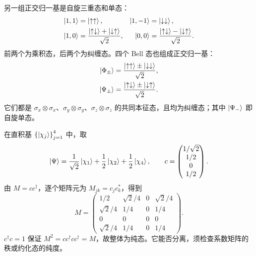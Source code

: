 另一组正交归一基是自旋三重态和单态：
\begin{align}
\Ket{1,1}&=\Ket{\uparrow\uparrow},&\Ket{1,-1}&=\Ket{\downarrow\downarrow},\\
\Ket{1,0}&=\frac{\Ket{\uparrow\downarrow}+\Ket{\downarrow\uparrow}}{\sqrt2},&
\Ket{0,0}&=\frac{\Ket{\uparrow\downarrow}-\Ket{\downarrow\uparrow}}{\sqrt2}.
\end{align}
前两个为乘积态，后两个为纠缠态。四个 Bell 态也组成正交归一基：
\begin{align}
\Ket{\Phi_\pm}&=\frac{\Ket{\uparrow\uparrow}\pm\Ket{\downarrow\downarrow}}{\sqrt2},\\
\Ket{\Psi_\pm}&=\frac{\Ket{\uparrow\downarrow}\pm\Ket{\downarrow\uparrow}}{\sqrt2}.
\end{align}
它们都是 $\sigma_x\otimes\sigma_x$、$\sigma_y\otimes\sigma_y$、$\sigma_z\otimes\sigma_z$ 的共同本征态，且均为纠缠态；其中 $\Ket{\Psi_-}$ 即自旋单态。

\begin{example}[整体纯态的密度矩阵]
在直积基 $\left\{\Ket{\chi_j}\right\}_{j=1}^4$ 中，取
\begin{equation}
\Ket{\Psi}=\frac1{\sqrt2}\Ket{\chi_1}+\frac12\Ket{\chi_2}+\frac12\Ket{\chi_4},
\qquad c=\left(\begin{matrix}1/\sqrt2\\1/2\\0\\1/2\end{matrix}\right).
\label{eq:composite-example-state}
\end{equation}
由 $M=cc^\dagger$，逐个矩阵元为 $M_{jk}=c_jc_k^*$，得到
\begin{equation}
M=\left(\begin{matrix}
1/2&\sqrt2/4&0&\sqrt2/4\\
\sqrt2/4&1/4&0&1/4\\
0&0&0&0\\
\sqrt2/4&1/4&0&1/4
\end{matrix}\right).
\label{eq:composite-example-density}
\end{equation}
$c^\dagger c=1$ 保证 $M^2=cc^\dagger cc^\dagger=M$，故整体为纯态。它能否分离，须检查系数矩阵的秩或约化态的纯度。
\end{example}
